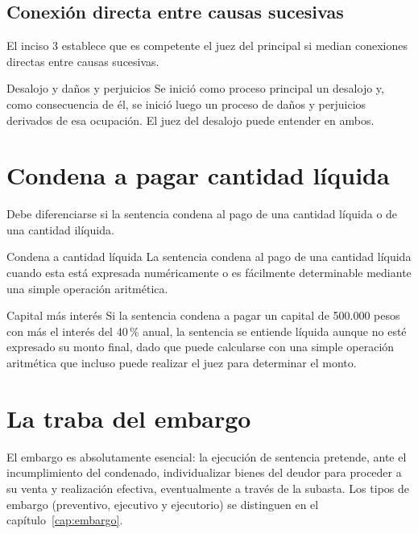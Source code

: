 \documentclass[12pt,oneside]{book}
\begin{document}
\subsection{Conexión directa entre causas sucesivas}

El inciso 3 establece que es competente el juez del principal si median conexiones directas entre causas sucesivas.

\begin{example}{Desalojo y daños y perjuicios}
Se inició como proceso principal un desalojo y, como consecuencia de él, se inició luego un proceso de daños y perjuicios derivados de esa ocupación. El juez del desalojo puede entender en ambos.
\end{example}

\section{Condena a pagar cantidad líquida}

Debe diferenciarse si la sentencia condena al pago de una cantidad líquida o de una cantidad ilíquida.

\begin{definition}{Condena a cantidad líquida}
La sentencia condena al pago de una cantidad líquida cuando esta está expresada numéricamente o es fácilmente determinable mediante una simple operación aritmética.
\end{definition}

\begin{example}{Capital más interés}
Si la sentencia condena a pagar un capital de 500.000 pesos con más el interés del 40\,\% anual, la sentencia se entiende líquida aunque no esté expresado su monto final, dado que puede calcularse con una simple operación aritmética que incluso puede realizar el juez para determinar el monto.
\end{example}

\section{La traba del embargo}

El embargo es absolutamente esencial: la ejecución de sentencia pretende, ante el incumplimiento del condenado, individualizar bienes del deudor para proceder a su venta y realización efectiva, eventualmente a través de la subasta. Los tipos de embargo (preventivo, ejecutivo y ejecutorio) se distinguen en el capítulo~\ref{cap:embargo}.
\end{document}
